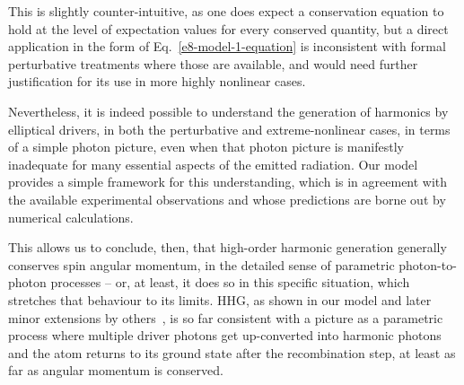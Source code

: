 This is slightly counter-intuitive, as one does expect a conservation equation to hold at the level of expectation values for every conserved quantity, but a direct application in the form of Eq.~\eqref{e8-model-1-equation} is inconsistent with formal perturbative treatments where those are available, and would need further justification for its use in more highly nonlinear cases.

Nevertheless, it is indeed possible to understand the generation of harmonics by elliptical drivers, in both the perturbative and extreme-nonlinear cases, in terms of a simple photon picture, even when that photon picture is manifestly inadequate for many essential aspects of the emitted radiation. Our model provides a simple framework for this understanding, which is in agreement with the available experimental observations and whose predictions are borne out by numerical calculations. 

This allows us to conclude, then, that high-order harmonic generation generally conserves spin angular momentum, in the detailed sense of parametric photon-to-photon processes -- or, at least, it does so in this specific situation, which stretches that behaviour to its limits. HHG, as shown in our model and later minor extensions by others~\cite{milosevic_bicircular-angular-momentum_2015}, is so far consistent with a picture as a parametric process where multiple driver photons get up-converted into harmonic photons and the atom returns to its ground state after the recombination step, at least as far as angular momentum is conserved.











































